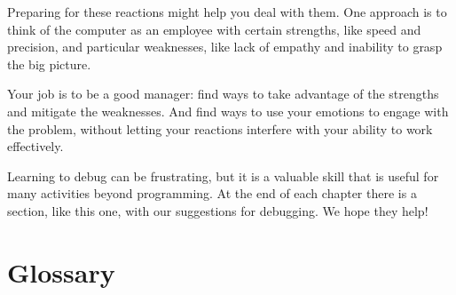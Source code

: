Preparing for these reactions might help you deal with them.
One approach is to think of the computer as an employee with
certain strengths, like speed and precision, and
particular weaknesses, like lack of empathy and inability
to grasp the big picture.

Your job is to be a good manager: find ways to take advantage
of the strengths and mitigate the weaknesses.  And find ways
to use your emotions to engage with the problem,
without letting your reactions interfere with your ability
to work effectively.

Learning to debug can be frustrating, but it is a valuable skill
that is useful for many activities beyond programming.  At the
end of each chapter there is a section, like this one,
with our suggestions for debugging.  We hope they help!


\section{Glossary}


